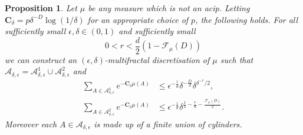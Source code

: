 \documentclass[10pt,a4paper]{amsart}
\newtheorem{prop}{Proposition}
\def\A{\ensuremath{\mathscr A}}
\def\F{\ensuremath{\mathcal F}}
\begin{document}
\begin{prop}\label{mainmf} Let $\mu$ be any measure which is not an acip.  Letting  $\mathbf{C}_\delta= p\delta^{-D}\log(1/\delta)$ for an appropriate choice of $p$, the following holds. 
For all sufficiently small $\epsilon, \delta \in (0,1)$ and sufficiently small
$$0<r<\frac{d}{2}(1-\F_\mu(D))$$
we can construct an $(\epsilon,\delta)$-multifractal discretisation of $\mu$ such that  $\A_{\delta,\epsilon}=\A_{\delta,\epsilon}^1\cup \A_{\delta,\epsilon}^2$ and 
\begin{align*}
\sum_{A \in \A^1_{\delta,\epsilon}} e^{-\mathbf{C}_\delta \mu(A)}& \leq \epsilon^{-\frac{1}{d}}\delta^{-\frac{D}{d}}\delta^{\delta^{-r}/2}, \\
\sum_{A \in \A^2_{\delta,\epsilon}} e^{-\mathbf{C}_\delta \mu(A)} &\leq\epsilon^{-\frac{1}{d}} \delta^{\frac{1}{2}-\frac{r}{d}-\frac{\F_\mu(D)}{2}}.
\end{align*}
Moreover each $A \in\A_{\delta,\epsilon}$ is made up of a finite union of cylinders.
\end{prop}
\end{document}
